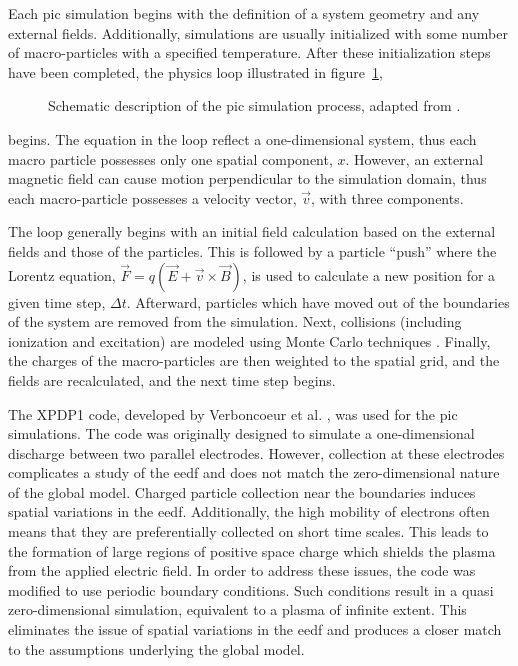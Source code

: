Each \acs{pic} simulation begins with the definition of a system geometry and
any external fields. Additionally, simulations are usually initialized with some
number of macro-particles with a specified temperature. After these
initialization steps have been completed, the physics loop illustrated in
figure~\ref{fig:pic},
\begin{figure}
  \centering
  
  \caption{Schematic description of the \acs{pic} simulation process, adapted
    from \cite{Birdsall1991}.}
  \label{fig:pic}
\end{figure}
begins. The equation in the loop reflect a one-dimensional system, thus each
macro particle possesses only one spatial component, $x$. However, an external
magnetic field can cause motion perpendicular to the simulation domain, thus
each macro-particle possesses a velocity vector, $\vec{v}$, with three
components.

The loop generally begins with an initial field calculation based on the
external fields and those of the particles. This is followed by a particle
``push'' where the Lorentz equation, $\vec{F} = q(\vec{E} +
\vec{v}\times\vec{B})$, is used to calculate a new position for a given time
step, $\Delta t$. Afterward, particles which have moved out of the boundaries of
the system are removed from the simulation. Next, collisions (including
ionization and excitation) are modeled using Monte Carlo techniques
\cite{Birdsall1991}. Finally, the charges of the macro-particles are then
weighted to the spatial grid, and the fields are recalculated, and the next time
step begins.

The XPDP1 code, developed by Verboncoeur et al. \cite{Verboncoeur1993}, was used
for the \acs{pic} simulations. The code was originally designed to simulate a
one-dimensional discharge between two parallel electrodes. However, collection
at these electrodes complicates a study of the \acs{eedf} and does not match the
zero-dimensional nature of the global model. Charged particle collection near
the boundaries induces spatial variations in the \acs{eedf}. Additionally, the
high mobility of electrons often means that they are preferentially collected on
short time scales. This leads to the formation of large regions of positive
space charge which shields the plasma from the applied electric field. In order
to address these issues, the code was modified to use periodic boundary
conditions. Such conditions result in a quasi zero-dimensional simulation,
equivalent to a plasma of infinite extent. This eliminates the issue of spatial
variations in the \acs{eedf} and produces a closer match to the assumptions
underlying the global model.

